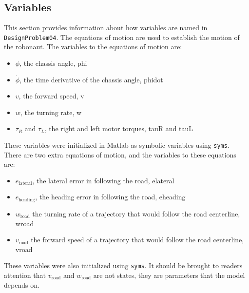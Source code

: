 \documentclass{article}
\begin{document}
\subsection{Variables}
This section provides information about how variables are named in \lstinline{DesignProblem04}. The equations of motion are used to establish the motion of the robonaut. The variables to the equations of motion are:
\begin{itemize}
\item $\phi$, the chassis angle, phi
\item $\dot{\phi}$, the time derivative of the chassis angle, phidot
\item $v$, the forward speed, v
\item $w$, the turning rate, w
\item $\tau_{R}$ and $\tau_{L}$, the right and left motor torques, tauR and tauL
\end{itemize}
These variables were initialized in Matlab as symbolic variables using \lstinline{syms}.\\
There are two extra equations of motion, and the variables to these equations are:
\begin{itemize}
\item $e_\text{lateral}$, the lateral error in following the road, elateral
\item $e_\text{heading}$, the heading error in following the road, eheading
\item $w_\text{road}$ the turning rate of a trajectory that would follow the road centerline, wroad
\item $v_\text{road}$ the forward speed of a trajectory that would follow the road centerline,  vroad
\end{itemize}

These variables were also initialized using \lstinline{syms}. It should be brought to readers attention that $v_\text{road}$ and $w_\text{road}$ are not states, they are parameters that the model depends on. 
\end{document}
